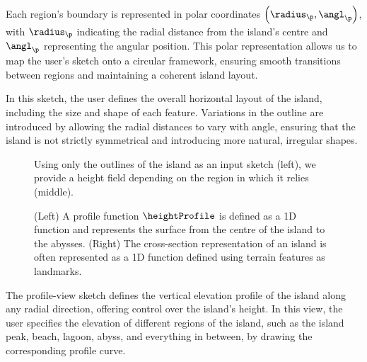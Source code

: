 Each region's boundary is represented in polar coordinates $\left(\radius_\p, \angl_\p\right)$, with $\radius_\p$ indicating the radial distance from the island's centre and $\angl_\p$ representing the angular position. This polar representation allows us to map the user's sketch onto a circular framework, ensuring smooth transitions between regions and maintaining a coherent island layout.

In this sketch, the user defines the overall horizontal layout of the island, including the size and shape of each feature. Variations in the outline are introduced by allowing the radial distances to vary with angle, ensuring that the island is not strictly symmetrical and introducing more natural, irregular shapes.

\begin{figure}[H]
    \caption{Using only the outlines of the island as an input sketch (left), we provide a height field depending on the region in which it relies (middle).}
    \label{fig:coral-island-procedural-height-only}
\end{figure}


\begin{figure}[H]
    \centering
    \caption{(Left) A profile function $\heightProfile$ is defined as a 1D function and represents the surface from the centre of the island to the abysses. (Right) The cross-section representation of an island is often represented as a 1D function defined using terrain features as landmarks.}
    \label{fig:coral-island-profile-function}
\end{figure}

The profile-view sketch defines the vertical elevation profile of the island along any radial direction, offering control over the island's height. In this view, the user specifies the elevation of different regions of the island, such as the island peak, beach, lagoon, abyss, and everything in between, by drawing the corresponding profile curve.

